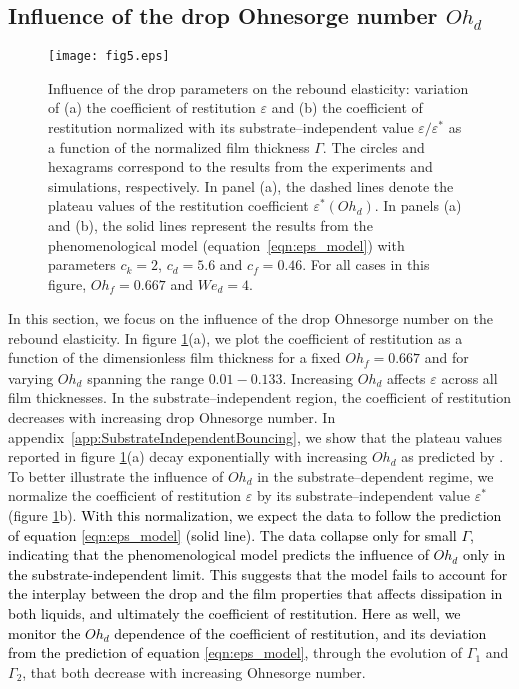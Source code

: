 \documentclass[]{jfm}
\newcommand{\revRev}[1]{\textcolor{black}{#1}}
\newcommand{\Ohd}{\mathit{Oh}_\mathit{d}}
\newcommand{\Ohf}{\mathit{Oh}_\mathit{f}}
\newcommand{\Wen}{\mathit{We}_\mathit{d}}
\begin{document}
\subsection{Influence of the drop Ohnesorge number $\Ohd$}
\begin{figure}
	\centering
	\texttt{[image: fig5.eps]}
	\caption{Influence of the drop parameters on the rebound elasticity: variation of (a) the coefficient of restitution $\varepsilon$ and (b) the coefficient of restitution normalized with its substrate--independent value $\varepsilon/\varepsilon^*$ as a function of the normalized film thickness $\Gamma$. The circles and hexagrams correspond to the results from the experiments and simulations, respectively. In panel (a), the dashed lines denote the plateau values of the restitution coefficient $\varepsilon^*(\Ohd)$. In panels (a) and (b), the solid lines represent the results from the phenomenological model (equation~\eqref{eqn:eps_model}) with parameters $c_{k} = 2$, $c_{d} = 5.6$ and $c_{f} = 0.46$. For all cases in this figure, $\Ohf = 0.667$ and $\Wen = 4$.}
	\label{fig:controlParameters2}
\end{figure}

In this section, we focus on the influence of the drop Ohnesorge number on the rebound elasticity.
In figure \ref{fig:controlParameters2}(a), we plot the coefficient of restitution as a function of the dimensionless film thickness for a fixed $\Ohf = 0.667$ and for varying $\Ohd$ spanning the range $0.01 - 0.133$. Increasing $\Ohd$ affects $\varepsilon$ across all film thicknesses. In the substrate--independent region, the coefficient of restitution decreases with increasing drop Ohnesorge number. In appendix~\ref{app:SubstrateIndependentBouncing}, we show that the plateau values reported in figure \ref{fig:controlParameters2}(a) decay exponentially with increasing $\Ohd$ as predicted by \citet{jha2020viscous}. To better illustrate the influence of $\Ohd$ in the substrate--dependent regime, we normalize the coefficient of restitution $\varepsilon$ by its substrate--independent value $\varepsilon^*$ (figure \ref{fig:controlParameters2}b). 
\revRev{With this normalization, we expect the data to follow the prediction of equation \eqref{eqn:eps_model} (solid line). 
	The data collapse only for small $\Gamma$, indicating that the phenomenological model predicts the influence of $\Ohd$ \revRev{only} in the substrate-independent limit. 
	This suggests that the model fails to account for the interplay between the drop and the film properties that affects dissipation in both liquids, and ultimately the coefficient of restitution.
	Here as well, we monitor the $\Ohd$ dependence of the coefficient of restitution, and its deviation from the prediction of equation \eqref{eqn:eps_model},} through the evolution of $\Gamma_1$ and $\Gamma_2$, that both decrease with increasing Ohnesorge number.
\end{document}

